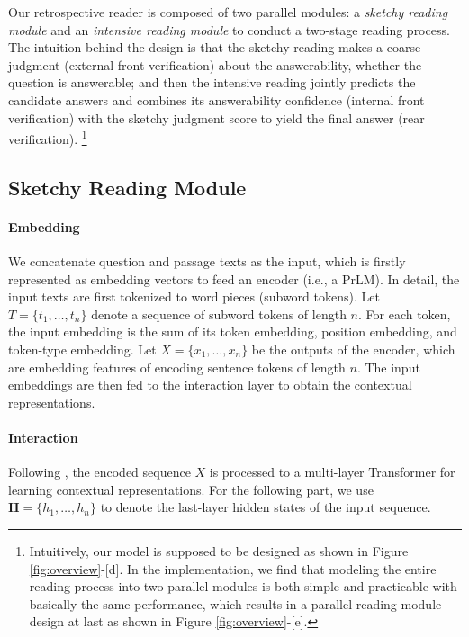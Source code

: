 \documentclass[letterpaper]{article} %
\begin{document}
Our retrospective reader is composed of two parallel modules: a \textit{sketchy reading module} and an \textit{intensive reading module} to conduct a two-stage reading process. The intuition behind the design is that the sketchy reading makes a coarse judgment (external front verification) about the answerability, whether the question is answerable; and then the intensive reading jointly predicts the candidate answers and combines its answerability confidence (internal front verification) with the sketchy judgment score to yield the final answer (rear verification).
\footnote{Intuitively, our model is supposed to be designed as shown in Figure \ref{fig:overview}-[d]. In the implementation, we find that modeling the entire reading process into two parallel modules is both simple and practicable with basically the same performance, which results in a parallel reading module design at last as shown in Figure \ref{fig:overview}-[e].}

\subsection{Sketchy Reading Module}
\paragraph{Embedding}
We concatenate question and passage texts as the input, which is firstly represented as embedding vectors to feed an encoder (i.e., a PrLM). In detail,
the input texts are first tokenized to word pieces (subword tokens). Let $T=\{t_1,\dots,t_n\}$ denote a sequence of subword tokens of length $n$.
For each token, the input embedding is the sum of its token embedding, position embedding, and token-type embedding.
Let $X = \{x_1, \dots, x_n\}$ be the outputs of the encoder, which are embedding features of encoding sentence tokens of length $n$. The input embeddings are then fed to the interaction layer to obtain the contextual representations.

\paragraph{Interaction}
Following \citet{devlin2018bert}, the encoded sequence $X$ is processed to a multi-layer Transformer \cite{DBLP:conf/nips/VaswaniSPUJGKP17} for learning contextual representations. For the following part, we use $\textbf{H} = \{h_1, \dots, h_n\}$ to denote the last-layer hidden states of the input sequence.
\end{document}
